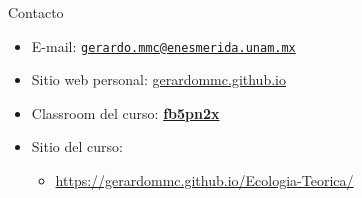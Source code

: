 \documentclass[
  11pt,
  ignorenonframetext,
]{beamer}
\providecommand{\tightlist}{%
  \setlength{\itemsep}{0pt}\setlength{\parskip}{0pt}}
\begin{document}
\begin{frame}{Contacto}
\begin{itemize}
\item
  E-mail:
  \href{mailto:gerardo.mmc@enesmerida.unam.mx}{\nolinkurl{gerardo.mmc@enesmerida.unam.mx}}
\item
  Sitio web personal:
  \href{https://gerardommc.github.com}{gerardommc.github.io}
\item
  Classroom del curso:
  \href{https://classroom.google.com/c/NjE3NDQ4Njg5NDgz?cjc=fb5pn2x}{\textbf{fb5pn2x}}
\item
  Sitio del curso:

  \begin{itemize}
  \tightlist
  \item
    \url{https://gerardommc.github.io/Ecologia-Teorica/}
  \end{itemize}
\end{itemize}
\end{frame}
\end{document}
